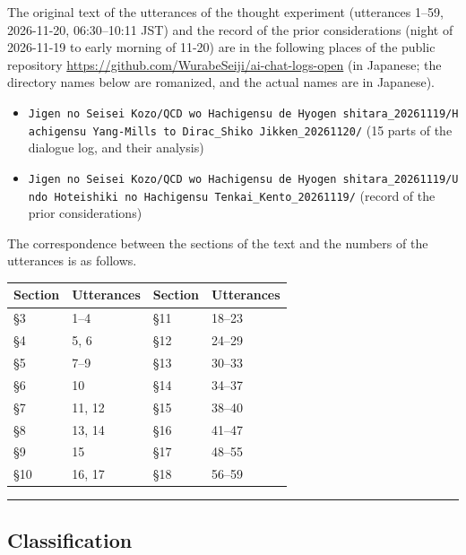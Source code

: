 \documentclass[
  a4paper,
]{article}
\newcounter{none} %
\providecommand{\tightlist}{%
  \setlength{\itemsep}{0pt}\setlength{\parskip}{0pt}}
\begin{document}
The original text of the utterances of the thought experiment
(utterances 1--59, 2026-11-20, 06:30--10:11 JST) and the record of the
prior considerations (night of 2026-11-19 to early morning of 11-20) are
in the following places of the public repository
\url{https://github.com/WurabeSeiji/ai-chat-logs-open} (in Japanese; the
directory names below are romanized, and the actual names are in
Japanese).

\begin{itemize}
\tightlist
\item
  \texttt{Jigen\ no\ Seisei\ Kozo/\allowbreak{}QCD\ wo\ Hachigensu\ de\ Hyogen\ shitara\_\allowbreak{}20261119/\allowbreak{}Hachigensu\ Yang-Mills\ to\ Dirac\_\allowbreak{}Shiko\ Jikken\_\allowbreak{}20261120/\allowbreak{}}
  (15 parts of the dialogue log, and their analysis)
\item
  \texttt{Jigen\ no\ Seisei\ Kozo/\allowbreak{}QCD\ wo\ Hachigensu\ de\ Hyogen\ shitara\_\allowbreak{}20261119/\allowbreak{}Undo\ Hoteishiki\ no\ Hachigensu\ Tenkai\_\allowbreak{}Kento\_\allowbreak{}20261119/\allowbreak{}}
  (record of the prior considerations)
\end{itemize}

The correspondence between the sections of the text and the numbers of
the utterances is as follows.

{\def\LTcaptype{none} %
\begin{longtable}[]{@{}llll@{}}
\toprule\noalign{}
Section & Utterances & Section & Utterances \\
\midrule\noalign{}
\endhead
\bottomrule\noalign{}
\endlastfoot
§3 & 1--4 & §11 & 18--23 \\
§4 & 5, 6 & §12 & 24--29 \\
§5 & 7--9 & §13 & 30--33 \\
§6 & 10 & §14 & 34--37 \\
§7 & 11, 12 & §15 & 38--40 \\
§8 & 13, 14 & §16 & 41--47 \\
§9 & 15 & §17 & 48--55 \\
§10 & 16, 17 & §18 & 56--59 \\
\end{longtable}
}

\begin{center}\rule{0.5\linewidth}{0.5pt}\end{center}

\subsection{Classification}\label{classification}
\end{document}
